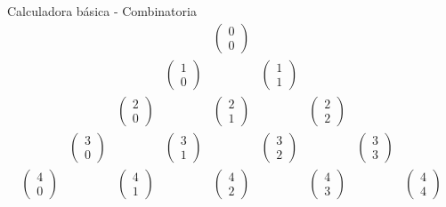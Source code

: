 \documentclass[
  ignorenonframetext,
]{beamer}
\begin{document}
\begin{frame}{Calculadora básica - Combinatoria}
\protect\hypertarget{calculadora-buxe1sica---combinatoria-2}{}
\[\begin{matrix}
&&&&\begin{pmatrix}0\\0\end{pmatrix}&&&&\\
&&&\begin{pmatrix}1\\0\end{pmatrix}&&\begin{pmatrix}1\\1\end{pmatrix}&&&\\
&&\begin{pmatrix}2\\0\end{pmatrix}&&\begin{pmatrix}2\\1\end{pmatrix}&&\begin{pmatrix}2\\2\end{pmatrix}&&\\
&\begin{pmatrix}3\\0\end{pmatrix}&&\begin{pmatrix}3\\1\end{pmatrix}&&\begin{pmatrix}3\\2\end{pmatrix}&&\begin{pmatrix}3\\3\end{pmatrix}&\\
\begin{pmatrix}4\\0\end{pmatrix}&&\begin{pmatrix}4\\1\end{pmatrix}&&\begin{pmatrix}4\\2\end{pmatrix}&&\begin{pmatrix}4\\3\end{pmatrix}&&\begin{pmatrix}4\\4\end{pmatrix}\end{matrix}\]
\end{frame}
\end{document}
